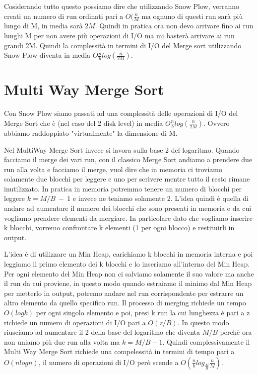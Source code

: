 \documentclass[14pt]{extreport}
\begin{document}
Cosiderando tutto questo possiamo dire che utilizzando Snow Plow, verranno creati un numero di run ordinati pari a $O(\frac{n}{M}$ ma ognuno di questi run sarà più lungo di M, in media sarà $2M$. Quindi in pratica ora non devo arrivare fino ai run lunghi M per non avere più operazioni di I/O ma mi basterà arrivare ai run grandi 2M.
Quindi la complessità in termini di I/O del Merge sort utilizzando Snow Plow diventa in media $O\frac{n}{b}log(\frac{n}{2M})$.

\section{Multi Way Merge Sort}

Con Snow Plow siamo passati ad una complessità delle operazioni di I/O del Merge Sort che è (nel caso del 2 disk level) in media $O\frac{n}{b}log(\frac{n}{2M})$. Ovvero abbiamo raddoppiato "virtualmente" la dimensione di M.

Nel MultiWay Merge Sort invece si lavora sulla base 2 del logaritmo.
Quando facciamo il merge dei vari run, con il classico Merge Sort andiamo a prendere due run alla volta e facciamo il merge, vuol dire che in memoria ci troviamo solamente due blocchi per leggere e uno per scrivere mentre tutto il resto rimane inutilizzato.
In pratica in memoria potremmo tenere un numero di blocchi per leggere $k = M/B\ -\ 1$ e invece ne teniamo solamente 2.
L'idea quindi è quella di andare ad aumentare il numero dei blocchi che sono presenti in memoria e da cui vogliamo prendere elementi da mergiare. In particolare dato che vogliamo inserire k blocchi, vorremo confrontare k elementi (1 per ogni blocco) e restituirli in output.

L'idea è di utilizzare un Min Heap, carichiamo k blocchi in memoria interna e poi leggiamo il primo elemento dei k blocchi e lo inseriamo all'interno del Min Heap.
Per ogni elemento del Min Heap non ci salviamo solamente il suo valore ma anche il run da cui proviene, in questo modo quando estraiamo il minimo dal Min Heap per metterlo in output, potremo andare nel run corrispondente per estrarre un altro elemento da quello specifico run. Il processo di merging richiede un tempo $O(log k)$ per ogni singolo elemento e poi, presi k run la cui lunghezza è pari a z richiede un numero di operazioni di I/O pari a $O(z/B)$.
In questo modo riusciamo ad aumentare il 2 della base del logaritmo che diventa $M/B$ perchè ora non uniamo più due run alla volta ma $k = M/B -1 $.
Quindi complessivamente il Multi Way Merge Sort richiede una compelessità in termini di tempo pari a $O(nlogn)$, il numero di operazioni di I/O però scende a $O(\frac{n}{b}log_{\frac{M}{B}}\frac{n}{M})$.
\end{document}
